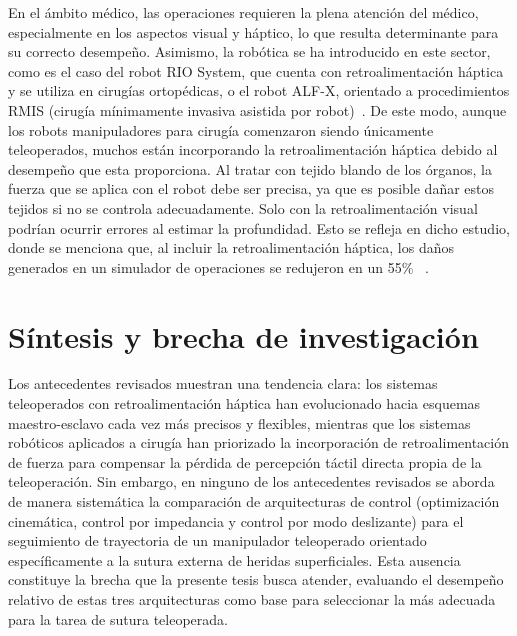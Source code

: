 En el ámbito médico, las operaciones requieren la plena atención del médico,
especialmente en los aspectos visual y háptico, lo que resulta determinante
para su correcto desempeño. Asimismo, la robótica se ha
introducido en este sector, como es el caso del robot RIO System, que cuenta
con retroalimentación háptica y se utiliza en cirugías ortopédicas, o el robot
ALF-X, orientado a procedimientos RMIS (cirugía mínimamente invasiva asistida
por robot)~\cite{robotica_haptics_retos_beneficios}. De este modo, aunque los robots
manipuladores para cirugía comenzaron siendo únicamente teleoperados, muchos
están incorporando la retroalimentación háptica debido al desempeño que esta
proporciona. Al tratar con tejido blando de los órganos, la fuerza que se
aplica con el robot debe ser precisa, ya que es posible dañar estos tejidos si
no se controla adecuadamente. Solo con la retroalimentación visual podrían
ocurrir errores al estimar la profundidad. Esto se refleja en dicho estudio,
donde se menciona que, al incluir la retroalimentación háptica, los daños
generados en un simulador de operaciones se redujeron en un 55\%
~\cite{robotica_haptics_retos_beneficios}.

\section{Síntesis y brecha de investigación}

Los antecedentes revisados muestran una tendencia clara: los sistemas
teleoperados con retroalimentación háptica han evolucionado hacia esquemas
maestro-esclavo cada vez más precisos y flexibles, mientras que los sistemas
robóticos aplicados a cirugía han priorizado la incorporación de
retroalimentación de fuerza para compensar la pérdida de percepción táctil
directa propia de la teleoperación. Sin embargo, en ninguno de los antecedentes
revisados se aborda de manera sistemática la comparación de arquitecturas de
control (optimización cinemática, control por impedancia y control por modo
deslizante) para el seguimiento de trayectoria de un manipulador teleoperado
orientado específicamente a la sutura externa de heridas superficiales. Esta
ausencia constituye la brecha que la presente tesis busca atender, evaluando el
desempeño relativo de estas tres arquitecturas como base para seleccionar la
más adecuada para la tarea de sutura teleoperada.

